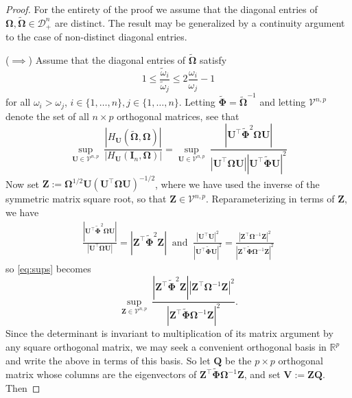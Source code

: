 \documentclass[12pt]{article}
\newcommand{\bl}[1]{{\mathbf #1}}
\newcommand{\bs}[1]{\boldsymbol #1}
\begin{document}
\begin{proof}

For the entirety of the proof we assume that the diagonal entries of $\bs{\Omega}, \tilde{\bs{\Omega}} \in \mathcal{D}_+^n$ are distinct. The result may be generalized by a continuity argument to the case of non-distinct diagonal entries.

($\implies$) Assume that the diagonal entries of $\tilde{\bs{\Omega}}$ satisfy
\begin{equation*}
    1 \leq \frac{\tilde{\omega}_i}{\tilde{\omega}_j} \leq 2\frac{\omega_i}{\omega_j} - 1
\end{equation*}
for all $\omega_i > \omega_j$, $i \in \{1, \dots, n\}, j \in \{1, \dots, n\}$. Letting $\tilde{\bs{\Phi}} = \tilde{\bs{\Omega}}^{-1}$ and letting $\mathcal{V}^{n,p}$ denote the set of all $n\times p$ orthogonal matrices, see that 
\begin{equation}\label{eq:sups}
    \underset{\bl{U} \in \mathcal{V}^{n,p}}{\sup}~ \frac{|H_{\bl{U}}(\tilde{\bs{\Omega}}, \bs{\Omega})|}{|H_{\bl{U}}(\bl{I}_n, \bs{\Omega})|} = \underset{\bl{U} \in \mathcal{V}^{n,p}}{\sup}~\frac{|\bl{U}^\top \tilde{\bs{\Phi}}^2 \bs{\Omega}\bl{U}|}{|\bl{U}^\top\bs{\Omega}\bl{U}| |\bl{U}^\top \tilde{\bs{\Phi}}\bl{U}|^2}
\end{equation}
Now set $\bl{Z} := \bs{\Omega}^{1/2} \bl{U} (\bl{U}^\top \bs{\Omega} \bl{U})^{-1/2}$, where we have used the inverse of the symmetric matrix square root, so that $\bl{Z} \in \mathcal{V}^{n,p}$. Reparameterizing in terms of $\bl{Z}$, we have
\begin{equation*}
    \begin{aligned}
        \frac{|\bl{U}^\top \tilde{\bs{\Phi}}^2 \bs{\Omega}\bl{U}|}{|\bl{U}^\top\bs{\Omega}\bl{U}|} = |\bl{Z}^\top \tilde{\bs{\Phi}}^2 \bl{Z}|~\text{ and }~ \frac{|\bl{U}^\top \bl{U}|^2}{|\bl{U}^\top \tilde{\bs{\Phi}}\bl{U}|^2} = \frac{|\bl{Z}^\top \bs{\Omega}^{-1} \bl{Z}|^2}{|\bl{Z}^\top \tilde{\bs{\Phi}} \bs{\Omega}^{-1} \bl{Z}|^2}
    \end{aligned}
\end{equation*}
so \eqref{eq:sups} becomes
\begin{equation*}
    \underset{\bl{Z} \in \mathcal{V}^{n,p}}{\sup}~ \frac{|\bl{Z}^\top \tilde{\bs{\Phi}}^2 \bl{Z}||\bl{Z}^\top \bs{\Omega}^{-1} \bl{Z}|^2}{|\bl{Z}^\top \tilde{\bs{\Phi}} \bs{\Omega}^{-1}\bl{Z}|^2} .
\end{equation*}
Since the determinant is invariant to multiplication of its matrix argument by any square orthogonal matrix, we may seek a convenient orthogonal basis in $\mathbb{R}^p$ and write the above in terms of this basis. So let $\bl{Q}$ be the $p \times p$ orthogonal matrix whose columns are the eigenvectors of $\bl{Z}^\top \tilde{\bs{\Phi}} \bs{\Omega}^{-1}\bl{Z}$, and set $\bl{V} := \bl{Z} \bl{Q}$. Then

\end{proof}
\end{document}
